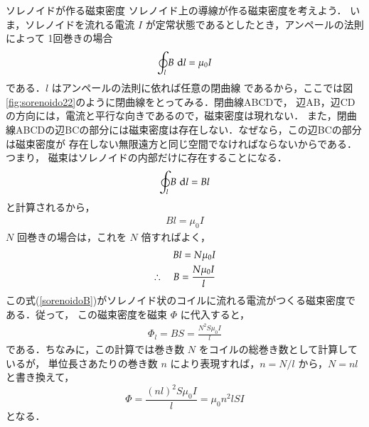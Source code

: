         \begin{memo}{ソレノイドが作る磁束密度}
            ソレノイド上の導線が作る磁束密度を考えよう．
            いま，ソレノイドを流れる電流 $I$ が定常状態であるとしたとき，アンペールの法則によって
            1回巻きの場合
            \begin{equation*}
                \oint_{l}B\,\,\mathrm{d} l =\mu_{0}I
            \end{equation*}
            である．$l$ はアンペールの法則に依れば任意の閉曲線
            であるから，ここでは図\ref{fig:sorenoido22}のように閉曲線をとってみる．閉曲線ABCDで，
            辺AB，辺CDの方向には，電流と平行な向きであるので，磁束密度は現れない．
            また，閉曲線ABCDの辺BCの部分には磁束密度は存在しない．なぜなら，この辺BCの部分は磁束密度が
            存在しない無限遠方と同じ空間でなければならないからである．つまり，
            磁束はソレノイドの内部だけに存在することになる．
            \begin{equation*}
            \oint_{l}B\,\,\mathrm{d} l=Bl
            \end{equation*}
            と計算されるから，
            \begin{align}
                Bl=\mu_{0} I
            \end{align}
            $N$ 回巻きの場合は，これを $N$ 倍すればよく，
            \begin{align}\label{sorenoidoB}
                Bl=N\mu_{0} I \\ \notag
                \therefore\quad B=\frac{N\mu_{0} I}{l}
            \end{align}
            この式(\ref{sorenoidoB})がソレノイド状のコイルに流れる電流がつくる磁束密度である．従って，
            この磁束密度を磁束 $\Phi$ に代入すると，
                \begin{align}
                    \Phi_{l}=BS=\frac{N^{2}S\mu_{0} I}{l}
                \end{align}
            である．ちなみに，この計算では巻き数 $N$ をコイルの総巻き数として計算しているが，
            単位長さあたりの巻き数 $n$ により表現すれば，$n=N/l$ から，$N=nl$ と書き換えて，
                \begin{equation*}
                    \Phi = \frac{(nl)^{2}S\mu_{0} I}{l} = \mu_{0}n^{2}lSI
                \end{equation*}
              となる．
                \begin{figure}[hbt]
                        \begin{center}

\end{center}
\end{figure}
\end{memo}
